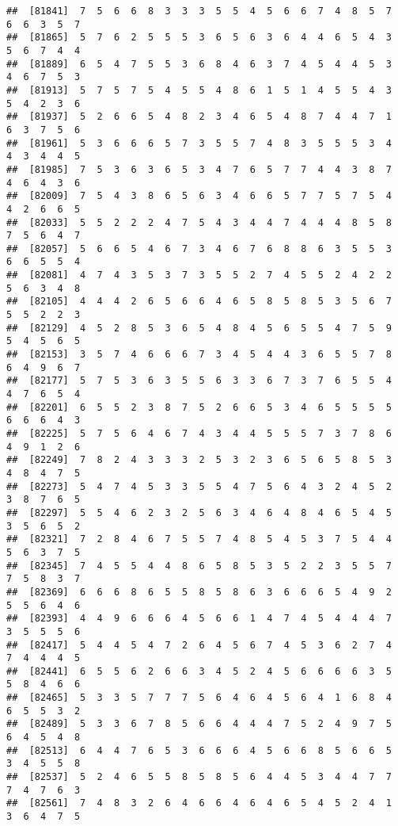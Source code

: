 \documentclass[
]{book}
\begin{document}
\begin{verbatim}
##  [81841]  7  5  6  6  8  3  3  3  5  5  4  5  6  6  7  4  8  5  7  6  6  3  5  7
##  [81865]  5  7  6  2  5  5  5  3  6  5  6  3  6  4  4  6  5  4  3  5  6  7  4  4
##  [81889]  6  5  4  7  5  5  3  6  8  4  6  3  7  4  5  4  4  5  3  4  6  7  5  3
##  [81913]  5  7  5  7  5  4  5  5  4  8  6  1  5  1  4  5  5  4  3  5  4  2  3  6
##  [81937]  5  2  6  6  5  4  8  2  3  4  6  5  4  8  7  4  4  7  1  6  3  7  5  6
##  [81961]  5  3  6  6  6  5  7  3  5  5  7  4  8  3  5  5  5  3  4  4  3  4  4  5
##  [81985]  7  5  3  6  3  6  5  3  4  7  6  5  7  7  4  4  3  8  7  4  6  4  3  6
##  [82009]  7  5  4  3  8  6  5  6  3  4  6  6  5  7  7  5  7  5  4  4  2  6  6  5
##  [82033]  5  5  2  2  2  4  7  5  4  3  4  4  7  4  4  4  8  5  8  7  5  6  4  7
##  [82057]  5  6  6  5  4  6  7  3  4  6  7  6  8  8  6  3  5  5  3  6  6  5  5  4
##  [82081]  4  7  4  3  5  3  7  3  5  5  2  7  4  5  5  2  4  2  2  5  6  3  4  8
##  [82105]  4  4  4  2  6  5  6  6  4  6  5  8  5  8  5  3  5  6  7  5  5  2  2  3
##  [82129]  4  5  2  8  5  3  6  5  4  8  4  5  6  5  5  4  7  5  9  5  4  5  6  5
##  [82153]  3  5  7  4  6  6  6  7  3  4  5  4  4  3  6  5  5  7  8  6  4  9  6  7
##  [82177]  5  7  5  3  6  3  5  5  6  3  3  6  7  3  7  6  5  5  4  4  7  6  5  4
##  [82201]  6  5  5  2  3  8  7  5  2  6  6  5  3  4  6  5  5  5  5  6  6  6  4  3
##  [82225]  5  7  5  6  4  6  7  4  3  4  4  5  5  5  7  3  7  8  6  4  9  1  2  6
##  [82249]  7  8  2  4  3  3  3  2  5  3  2  3  6  5  6  5  8  5  3  4  8  4  7  5
##  [82273]  5  4  7  4  5  3  3  5  5  4  7  5  6  4  3  2  4  5  2  3  8  7  6  5
##  [82297]  5  5  4  6  2  3  2  5  6  3  4  6  4  8  4  6  5  4  5  3  5  6  5  2
##  [82321]  7  2  8  4  6  7  5  5  7  4  8  5  4  5  3  7  5  4  4  5  6  3  7  5
##  [82345]  7  4  5  5  4  4  8  6  5  8  5  3  5  2  2  3  5  5  7  7  5  8  3  7
##  [82369]  6  6  6  8  6  5  5  8  5  8  6  3  6  6  6  5  4  9  2  5  5  6  4  6
##  [82393]  4  4  9  6  6  6  4  5  6  6  1  4  7  4  5  4  4  4  7  3  5  5  5  6
##  [82417]  5  4  4  5  4  7  2  6  4  5  6  7  4  5  3  6  2  7  4  7  4  4  4  5
##  [82441]  6  5  5  6  2  6  6  3  4  5  2  4  5  6  6  6  6  3  5  5  8  4  6  6
##  [82465]  5  3  3  5  7  7  7  5  6  4  6  4  5  6  4  1  6  8  4  6  5  5  3  2
##  [82489]  5  3  3  6  7  8  5  6  6  4  4  4  7  5  2  4  9  7  5  6  4  5  4  8
##  [82513]  6  4  4  7  6  5  3  6  6  6  4  5  6  6  8  5  6  6  5  3  4  5  5  8
##  [82537]  5  2  4  6  5  5  8  5  8  5  6  4  4  5  3  4  4  7  7  7  4  7  6  3
##  [82561]  7  4  8  3  2  6  4  6  6  4  6  4  6  5  4  5  2  4  1  3  6  4  7  5

\end{verbatim}
\end{document}

